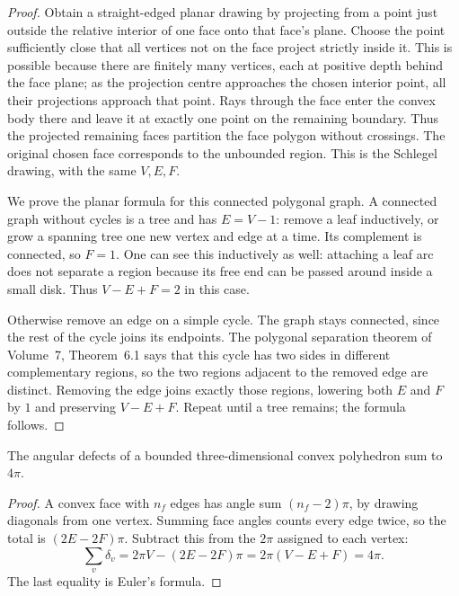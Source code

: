 \begin{proof}
Obtain a straight-edged planar drawing by projecting from a point just outside the relative interior of one face onto that face's plane. Choose the point sufficiently close that all vertices not on the face project strictly inside it. This is possible because there are finitely many vertices, each at positive depth behind the face plane; as the projection centre approaches the chosen interior point, all their projections approach that point. Rays through the face enter the convex body there and leave it at exactly one point on the remaining boundary. Thus the projected remaining faces partition the face polygon without crossings. The original chosen face corresponds to the unbounded region. This is the Schlegel drawing, with the same $V,E,F$.

We prove the planar formula for this connected polygonal graph. A connected graph without cycles is a tree and has $E=V-1$: remove a leaf inductively, or grow a spanning tree one new vertex and edge at a time. Its complement is connected, so $F=1$. One can see this inductively as well: attaching a leaf arc does not separate a region because its free end can be passed around inside a small disk. Thus $V-E+F=2$ in this case.

Otherwise remove an edge on a simple cycle. The graph stays connected, since the rest of the cycle joins its endpoints. The polygonal separation theorem of Volume~7, Theorem~6.1 says that this cycle has two sides in different complementary regions, so the two regions adjacent to the removed edge are distinct. Removing the edge joins exactly those regions, lowering both $E$ and $F$ by $1$ and preserving $V-E+F$. Repeat until a tree remains; the formula follows.
\end{proof}

\begin{theorem}[Descartes]\label{geometry:thm:descartesdefect}
The angular defects of a bounded three-dimensional convex polyhedron sum to $4\pi$.
\end{theorem}

\begin{proof}
A convex face with $n_f$ edges has angle sum $(n_f-2)\pi$, by drawing diagonals from one vertex. Summing face angles counts every edge twice, so the total is $(2E-2F)\pi$. Subtract this from the $2\pi$ assigned to each vertex:
\[
\sum_v\delta_v=2\pi V-(2E-2F)\pi=2\pi(V-E+F)=4\pi.
\]
The last equality is Euler's formula.
\end{proof}

